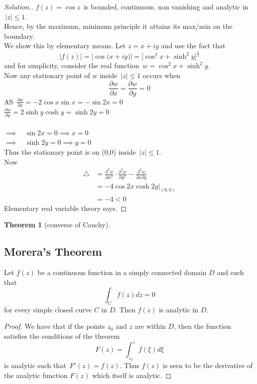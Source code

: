 \documentclass[11pt,a4paper]{article}
\theoremstyle{definition}
\newtheorem{thm}{Theorem}[section]
\newenvironment{solution}
  {\renewcommand{\qedsymbol}{}\begin{proof}[\textit{Solution}.]}
  {\end{proof}}
\begin{document}
\begin{solution}
$f(z)  = \cos z\,$ is bounded, continuous, non vanishing and analytic in $\, \left|z\right| \leq 1$.\\
Hence, by the maximum, minimum principle it attains its max/min on the boundary.\\
We show this by elementary means. Let $z = x + iy$ and use the fact that 
$$\left|f(z)\right| = \left|\cos \big(x + iy\big)\right| = \Big[\cos^2x + \sinh^2y\Big]^{\frac{1}{2}}$$
and for simplicity, consider the real function $\, w = \cos^2x + \sinh^2y$.\\
Now any stationary point of $w$ inside $\, \left|z\right| \leq 1$ occurs when $$\frac{\partial w}{\partial x} = \frac{\partial w}{\partial y} = 0$$
AS $\, \frac{\partial w}{\partial x} = -2\cos x\sin x = -\sin2x = 0$\\

$\frac{\partial w}{\partial y } = 2\sinh y \cosh y = \sinh 2y = 0$\\\\

$\implies \quad  \sin 2x = 0 \implies x = 0$\\

$\implies \quad  \sinh 2y = 0 \implies y = 0$\\

Thus the stationary point is on (0,0) inside $\, \left|z\right| \leq 1$.\\
Now
\begin{align*}
\triangle & = \frac{\partial^2w}{\partial x^2} \cdot\frac{\partial^2w}{\partial y^2} - \frac{\partial^2w}{\partial x \partial y}\\
& = -4\cos 2x \cosh 2y\Big|_{(0,0)}\\
& = -4 < 0
\end{align*}
Elementary real variable theory says.
\end{solution}

\begin{thm}[converse of Cauchy]
\end{thm}
{\color[wave]{485}\subsection{Morera's Theorem}}
Let $f(z)$ be a continuous function in a simply connected domain $D$ and such that $$\int_C f(z)dz = 0$$ for every simple closed curve $C$ in $D$. Then $f(z)$ is analytic in $D$.\\


\begin{proof}
We have that if the points $z_0$ and $z$ are within $D$, then the function satisfies the conditions of the theorem $$F(z) = \int^z_{z_0} f(\xi) d\xi$$ is analytic such that $\, F'(z) = f(z)$. Thus $f(z)$ is seen to be the derivative of the analytic function $F(z)$ which itself is analytic.
\end{proof}
\end{document}
